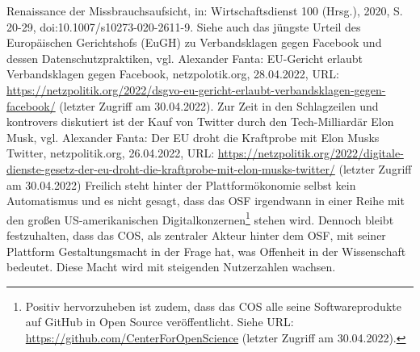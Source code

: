 \begin{enumerate}
{Renaissance der Missbrauchsaufsicht, in: Wirtschaftsdienst 100 (Hrsg.), 2020, S. 20-29, doi:10.1007/s10273-020-2611-9. Siehe auch das jüngste Urteil des Europäischen Gerichtshofs (EuGH) zu Verbandsklagen gegen Facebook und dessen Datenschutzpraktiken, vgl. Alexander Fanta: EU-Gericht erlaubt Verbandsklagen gegen Facebook, netzpolotik.org, 28.04.2022, URL: \url{https://netzpolitik.org/2022/dsgvo-eu-gericht-erlaubt-verbandsklagen-gegen-facebook/} (letzter Zugriff am 30.04.2022). Zur Zeit in den Schlagzeilen und kontrovers diskutiert ist der Kauf von Twitter durch den Tech-Milliardär Elon Musk, vgl. Alexander Fanta: Der EU droht die Kraftprobe mit Elon Musks Twitter, netzpolitik.org, 26.04.2022, URL: \url{https://netzpolitik.org/2022/digitale-dienste-gesetz-der-eu-droht-die-kraftprobe-mit-elon-musks-twitter/} (letzter Zugriff am 30.04.2022)} Freilich steht hinter der Plattformökonomie selbst kein Automatismus und es nicht gesagt, dass das OSF irgendwann in einer Reihe mit den großen US-amerikanischen Digitalkonzernen\footnote{Positiv hervorzuheben ist zudem, dass das COS alle seine Softwareprodukte auf GitHub in Open Source veröffentlicht. Siehe URL: \url{https://github.com/CenterForOpenScience} (letzter Zugriff am 30.04.2022).} stehen wird. Dennoch bleibt festzuhalten, dass das COS, als zentraler Akteur hinter dem OSF, mit seiner Plattform Gestaltungsmacht in der Frage hat, was Offenheit in der Wissenschaft bedeutet. Diese Macht wird mit steigenden Nutzerzahlen wachsen.


\end{enumerate}
